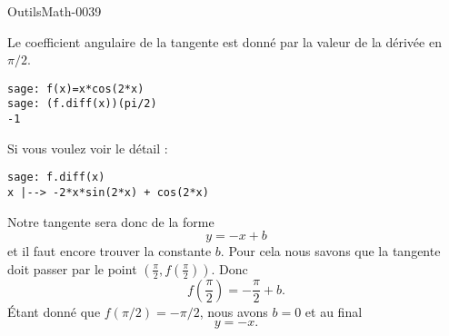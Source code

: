 
\begin{corrige}{OutilsMath-0039}

    Le coefficient angulaire de la tangente est donné par la valeur de la dérivée en $\pi/2$.

    \begin{verbatim}
sage: f(x)=x*cos(2*x)
sage: (f.diff(x))(pi/2)
-1
    \end{verbatim}
    Si vous voulez voir le détail :
    \begin{verbatim}
sage: f.diff(x)
x |--> -2*x*sin(2*x) + cos(2*x)
    \end{verbatim}
    Notre tangente sera donc de la forme
    \begin{equation}
        y=-x+b
    \end{equation}
    et il faut encore trouver la constante $b$. Pour cela nous savons que la tangente doit passer par le point $(\frac{ \pi }{ 2 },f(\frac{ \pi }{ 2 }))$. Donc
    \begin{equation}
        f\left( \frac{ \pi }{ 2 } \right)=-\frac{ \pi }{ 2 }+b.
    \end{equation}
    Étant donné que $f(\pi/2)=-\pi/2$, nous avons $b=0$ et au final
    \begin{equation}
        y=-x.
    \end{equation}

\end{corrige}
